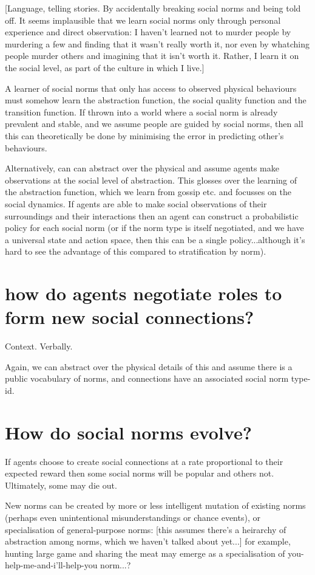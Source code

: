 \documentclass[a4paper]{article}
\begin{document}
[Language, telling stories. By accidentally breaking social norms and being told off. It seems implausible that we learn social norms only through personal experience and direct observation: I haven't learned not to murder people by murdering a few and finding that it wasn't really worth it, nor even by whatching people murder others and imagining that it isn't worth it. Rather, I learn it on the social level, as part of the culture in which I live.]

A learner of social norms that only has access to observed physical behaviours must somehow learn the abstraction function, the social quality function and the transition function. If thrown into a world where a social norm is already prevalent and stable, and we assume people are guided by social norms, then all this can theoretically be done by minimising the error in predicting other's behaviours.

Alternatively, can can abstract over the physical and assume agents make observations at the social level of abstraction. This glosses over the learning of the abstraction function, which we learn from gossip etc. and focusses on the social dynamics. If agents are able to make social observations of their surroundings and their interactions then an agent can construct a probabilistic policy for each social norm (or if the norm type is itself negotiated, and we have a universal state and action space, then this can be a single policy...although it's hard to see the advantage of this compared to stratification by norm).


\section{how do agents negotiate roles to form new social connections?}
Context. Verbally.

Again, we can abstract over the physical details of this and assume there is a public vocabulary of norms, and connections have an associated social norm type-id.

\section{How do social norms evolve?}

If agents choose to create social connections at a rate proportional to their expected reward then some social norms will be popular and others not. Ultimately, some may die out.

New norms can be created by more or less intelligent mutation of existing norms (perhaps even unintentional misunderstandings or chance events), or specialisation of general-purpose norms: [this assumes there's a heirarchy of abstraction among norms, which we haven't talked about yet...] for example, hunting large game and sharing the meat may emerge as a specialisation of you-help-me-and-i'll-help-you norm...?
\end{document}
